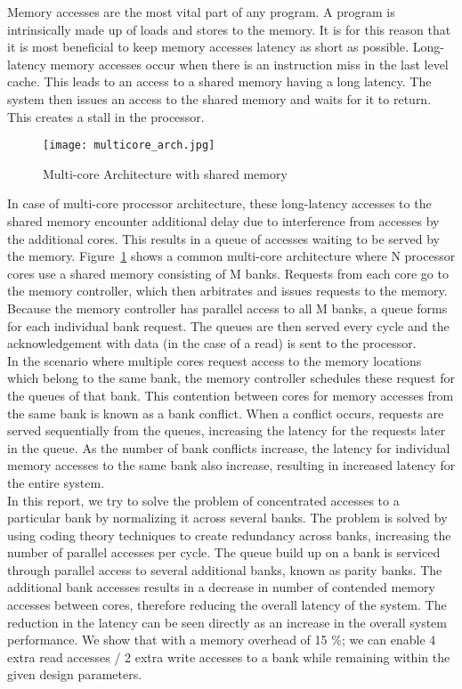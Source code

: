 Memory accesses are the most vital part of any program. A program is intrinsically made up of loads and stores to the memory. It is for this reason that it is most beneficial to keep memory accesses latency as short as possible. Long-latency memory accesses occur when there is an instruction miss in the last level cache. This leads to an access to a shared memory having a long latency. The system then issues an access to the shared memory and waits for it to return. This creates a stall in the processor. 
\begin{figure}[ht!]
\centering
\texttt{[image: multicore\_arch.jpg]}
\caption{Multi-core Architecture with shared memory}
\label{fig:multicore_arch}
\end{figure}
In case of multi-core processor architecture, these long-latency accesses to the shared memory encounter additional delay due to interference from accesses by the additional cores. This results in a queue of accesses waiting to be served by the memory. Figure~\ref{fig:multicore_arch}  shows a common multi-core architecture where N processor cores use a shared memory consisting of M banks. Requests from each core go to the memory controller, which then arbitrates and issues requests to the memory. Because the memory controller has parallel access to all M banks, a queue forms for each individual bank request. The queues are then served every cycle and the acknowledgement with data (in the case of a read) is sent to the processor. \\
In the scenario where multiple cores request access to the memory locations which belong to the same bank, the memory controller schedules these request for the queues of that bank. This contention between cores for memory accesses from the same bank is known as a bank conflict. When a conflict occurs, requests are served sequentially from the queues, increasing the latency for the requests later in the queue. As the number of bank conflicts increase, the latency for individual memory accesses to the same bank also increase, resulting in increased latency for the entire system. \\ 
In this report, we try to solve the problem of concentrated accesses to a particular bank by normalizing it across several banks. The problem is solved by using coding theory techniques to create redundancy across banks, increasing the number of parallel accesses per cycle. The queue build up on a bank is serviced through parallel access to several additional banks, known as parity banks. The additional bank accesses results in a decrease in number of contended memory accesses between cores, therefore reducing the overall latency of the system. The reduction in the latency can be seen directly as an increase in the overall system performance. We show that with a memory overhead of 15 $\%$; we can enable 4 extra read accesses / 2 extra write accesses to a bank while remaining within the given design parameters. 
